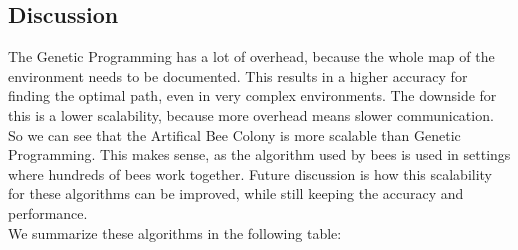 \subsection{Discussion}
The Genetic Programming has a lot of overhead, because the whole map of the environment needs to be documented. 
This results in a higher accuracy for finding the optimal path, even in very complex environments. 
The downside for this is a lower scalability, because more overhead means slower communication.
So we can see that the Artifical Bee Colony is more scalable than Genetic Programming.
This makes sense, as the algorithm used by bees is used in settings where hundreds of bees work together. 
Future discussion is how this scalability for these algorithms can be improved, while still keeping the accuracy and performance. \\
    
We summarize these algorithms in the following table:

  \begin{table}[H]
  \renewcommand{\arraystretch}{1.3}
  \caption{Path-planning algorithms}
  \label{table_alg_path_planning}
  \centering
{}
  \end{table}

  

